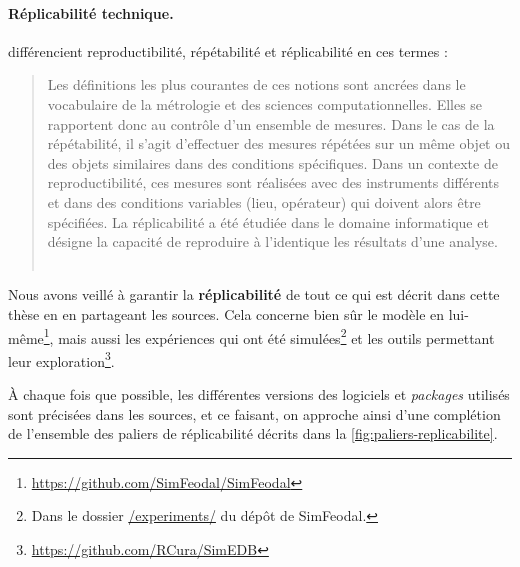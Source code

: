 \paragraph{Réplicabilité technique.}

\textcite{reycoyrehourcq:hal-01677950} différencient reproductibilité, répétabilité et réplicabilité en ces termes :
\begin{quotation}
	\noindent \og
	Les définitions les plus courantes de ces notions sont ancrées dans le vocabulaire de la métrologie et des sciences computationnelles.
	Elles se rapportent donc au contrôle d'un ensemble de mesures.
	Dans le cas de la répétabilité, il s'agit d'effectuer des mesures répétées sur un même objet ou des objets similaires dans des conditions spécifiques.
	Dans un contexte de reproductibilité, ces mesures sont réalisées avec des instruments différents et dans des conditions variables (lieu, opérateur) qui doivent alors être spécifiées.
	La réplicabilité a été étudiée dans le domaine informatique et désigne la capacité de reproduire à l'identique les résultats d'une analyse.
	\fg{}\\
	\mbox{}~ \hfill \cite[411]{reycoyrehourcq:hal-01677950}
\end{quotation}

Nous avons veillé à garantir la \textbf{réplicabilité} de tout ce qui est décrit dans cette thèse en en partageant les sources.
Cela concerne bien sûr le modèle \simfeodal{} en lui-même\footnote{
\href{https://github.com/SimFeodal/SimFeodal}{https://github.com/SimFeodal/SimFeodal}
}, mais aussi les expériences qui ont été simulées\footnote{
	Dans le dossier \href{https://github.com/SimFeodal/SimFeodal/tree/master/experiments}{\textsf{/experiments/}} du dépôt de SimFeodal.
} et les outils permettant leur exploration\footnote{
\href{https://github.com/RCura/SimEDB}{https://github.com/RCura/SimEDB}
}.

À chaque fois que possible, les différentes versions des logiciels et \textit{packages} utilisés sont précisées dans les sources, et ce faisant, on approche ainsi d'une complétion de l'ensemble des \og paliers de réplicabilité\fg{} décrits dans la \cref{fig:paliers-replicabilite}.

